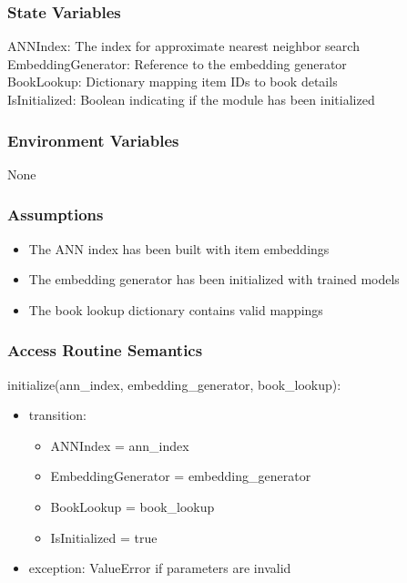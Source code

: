 \documentclass[12pt, titlepage]{article}
\begin{document}
\subsubsection{State Variables}
ANNIndex: The index for approximate nearest neighbor search\\
EmbeddingGenerator: Reference to the embedding generator\\
BookLookup: Dictionary mapping item IDs to book details\\
IsInitialized: Boolean indicating if the module has been initialized

\subsubsection{Environment Variables}

None

\subsubsection{Assumptions}

\begin{itemize}
  \item The ANN index has been built with item embeddings
  \item The embedding generator has been initialized with trained models
  \item The book lookup dictionary contains valid mappings
\end{itemize}

\subsubsection{Access Routine Semantics}

\noindent initialize(ann\_index, embedding\_generator, book\_lookup):
\begin{itemize}
  \item transition:
  \begin{itemize}
    \item ANNIndex = ann\_index
    \item EmbeddingGenerator = embedding\_generator
    \item BookLookup = book\_lookup
    \item IsInitialized = true
  \end{itemize}
\item exception: ValueError if parameters are invalid
\end{itemize}
\end{document}
